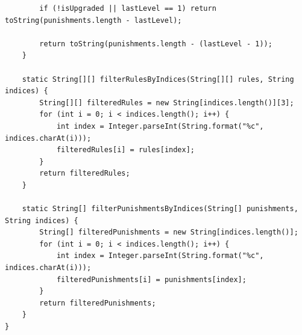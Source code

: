 \documentclass[12pt,titlepage]{article}
\begin{document}
\begin{verbatim}
        if (!isUpgraded || lastLevel == 1) return toString(punishments.length - lastLevel);

        return toString(punishments.length - (lastLevel - 1));
    }

    static String[][] filterRulesByIndices(String[][] rules, String indices) {
        String[][] filteredRules = new String[indices.length()][3];
        for (int i = 0; i < indices.length(); i++) {
            int index = Integer.parseInt(String.format("%c", indices.charAt(i)));
            filteredRules[i] = rules[index];
        }
        return filteredRules;
    }

    static String[] filterPunishmentsByIndices(String[] punishments, String indices) {
        String[] filteredPunishments = new String[indices.length()];
        for (int i = 0; i < indices.length(); i++) {
            int index = Integer.parseInt(String.format("%c", indices.charAt(i)));
            filteredPunishments[i] = punishments[index];
        }
        return filteredPunishments;
    }
}
\end{verbatim}
\end{document}

